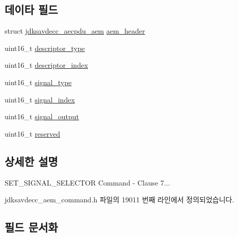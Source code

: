 \subsection*{데이타 필드}
\begin{DoxyCompactItemize}
\item 
struct \hyperlink{structjdksavdecc__aecpdu__aem}{jdksavdecc\+\_\+aecpdu\+\_\+aem} \hyperlink{structjdksavdecc__aem__command__set__signal__selector_ae1e77ccb75ff5021ad923221eab38294}{aem\+\_\+header}
\item 
uint16\+\_\+t \hyperlink{structjdksavdecc__aem__command__set__signal__selector_ab7c32b6c7131c13d4ea3b7ee2f09b78d}{descriptor\+\_\+type}
\item 
uint16\+\_\+t \hyperlink{structjdksavdecc__aem__command__set__signal__selector_a042bbc76d835b82d27c1932431ee38d4}{descriptor\+\_\+index}
\item 
uint16\+\_\+t \hyperlink{structjdksavdecc__aem__command__set__signal__selector_a248e60ef99d5ed1779989d1dd6b6dc5a}{signal\+\_\+type}
\item 
uint16\+\_\+t \hyperlink{structjdksavdecc__aem__command__set__signal__selector_ae2e81a95ee9ad83f1fe22b6a1ee29075}{signal\+\_\+index}
\item 
uint16\+\_\+t \hyperlink{structjdksavdecc__aem__command__set__signal__selector_ab4b91864e6fc335d7e86536d9f4461e4}{signal\+\_\+output}
\item 
uint16\+\_\+t \hyperlink{structjdksavdecc__aem__command__set__signal__selector_a5a6ed8c04a3db86066924b1a1bf4dad3}{reserved}
\end{DoxyCompactItemize}


\subsection{상세한 설명}
S\+E\+T\+\_\+\+S\+I\+G\+N\+A\+L\+\_\+\+S\+E\+L\+E\+C\+T\+OR Command -\/ Clause 7... 

jdksavdecc\+\_\+aem\+\_\+command.\+h 파일의 19011 번째 라인에서 정의되었습니다.



\subsection{필드 문서화}
